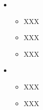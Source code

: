   \begin{itemize}[leftmargin=*]
    \item
      {\small
      \begin{itemize}
        \item XXX
        \item XXX
        \item XXX
      \end{itemize}
      }
    \item
      {\small
      \begin{itemize}
        \item XXX
        \item XXX
      \end{itemize}
      }
  \end{itemize}

